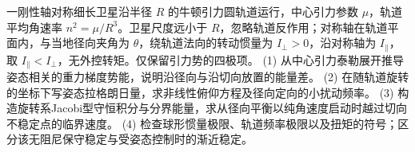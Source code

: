 一刚性轴对称细长卫星沿半径 \(R\) 的牛顿引力圆轨道运行，中心引力参数 \(\mu\)，轨道平均角速率 \(n^2=\mu/R^3\)。卫星尺度远小于 \(R\)，忽略轨道反作用；对称轴在轨道平面内，与当地径向夹角为 \(\theta\)，绕轨道法向的转动惯量为 \(I_\perp>0\)，沿对称轴为 \(I_\parallel\)，取 \(I_\parallel<I_\perp\)，无外控转矩。仅保留引力势的四极项。
(1) 从中心引力泰勒展开推导姿态相关的重力梯度势能，说明沿径向与沿切向放置的能量差。
(2) 在随轨道旋转的坐标下写姿态拉格朗日量，求非线性俯仰方程及径向定向的小扰动频率。
(3) 构造旋转系Jacobi型守恒积分与分界能量，求从径向平衡以纯角速度启动时越过切向不稳定点的临界速度。
(4) 检查球形惯量极限、轨道频率极限以及扭矩的符号；区分该无阻尼保守稳定与受姿态控制时的渐近稳定。
